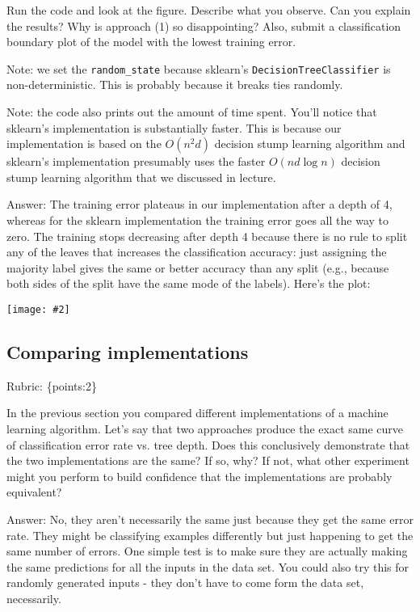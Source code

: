 \documentclass{article}
\def\ans#1{\par\gre{Answer: #1}}
\def\answer#1{\ans{#1}}
\def\rubric#1{\gre{Rubric: \{#1\}}}{}
\def\blu#1{{\color{blu}#1}}
\def\gre#1{{\color{gre}#1}}
\newcommand{\centerfig}[2]{\begin{center}\texttt{[image: \#2]}\end{center}}
\begin{document}
	Run the code and look at the figure.
	\blu{Describe what you observe. Can you explain the results?} Why is approach (1) so disappointing? Also, \blu{submit a classification boundary plot of the model with the lowest training error}.
	
	Note: we set the \verb|random_state| because sklearn's \texttt{DecisionTreeClassifier} is non-deterministic. This is probably
	because it breaks ties randomly.
	
	Note: the code also prints out the amount of time spent. You'll notice that sklearn's implementation is substantially faster. This is because
	our implementation is based on the $O(n^2d)$ decision stump learning algorithm and sklearn's implementation presumably uses the faster $O(nd\log n)$
	decision stump learning algorithm that we discussed in lecture.
	
	\answer{
		The training error plateaus in our implementation after a depth of 4, whereas for the sklearn implementation the training error goes all the way to zero.
		The training stops decreasing after depth 4 because there is no rule to split
		any of the leaves that increases the classification accuracy:
		just assigning the majority label gives the same or better accuracy than any split (e.g., because both sides of the split have the same mode of the labels).
		Here's the plot:\\
		\centerfig{0.7}{../figs/q6_5_decisionBoundary.pdf}
	}
	
	\subsection{Comparing implementations}
	\rubric{points:2}
	
	In the previous section you compared different implementations of a machine learning algorithm. Let's say that two
	approaches produce the exact same curve of classification error rate vs. tree depth. Does this conclusively demonstrate
	that the two implementations are the same? If so, why? If not, what other experiment might you perform to build confidence
	that the implementations are probably equivalent?
	
	\answer{
		No, they aren't necessarily the same just because they get the same error rate. They might be classifying examples
		differently but just happening to get the same number of errors. One simple test is to make sure they are actually
		making the same predictions for all the inputs in the data set. You could also try this for randomly generated inputs -
		they don't have to come form the data set, necessarily. 
	}
	
\end{document}

